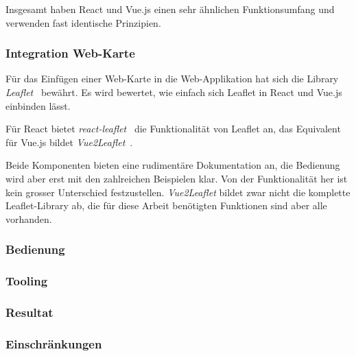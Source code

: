 Insgesamt haben React und Vue.js einen sehr ähnlichen Funktionsumfang und verwenden fast identische Prinzipien.

\subsubsection{Integration Web-Karte}
\label{Analyse Framework:Integration Web-Karte}

Für das Einfügen einer Web-Karte in die Web-Applikation hat sich die Library \emph{Leaflet}~\cite{leaflet} bewährt.
Es wird bewertet, wie einfach sich Leaflet in React und Vue.js einbinden lässt.

Für React bietet \emph{react-leaflet}~\cite{react-leaflet} die Funktionalität von Leaflet an, das Equivalent für Vue.js bildet \emph{Vue2Leaflet}~\cite{vue2leaflet}.

Beide Komponenten bieten eine rudimentäre Dokumentation an, die Bedienung wird aber erst mit den zahlreichen Beispielen klar.
Von der Funktionalität her ist kein grosser Unterschied festzustellen.
\emph{Vue2Leaflet} bildet zwar nicht die komplette Leaflet-Library ab, die für diese Arbeit benötigten Funktionen sind aber alle vorhanden.


\subsubsection{Bedienung}
\label{Analyse Framework:Bedienung}

\subsubsection{Tooling}
\label{Analyse Framework:Bedienung}


\subsubsection{Resultat}
\label{Analyse Framework:Resulat}



\subsubsection{Einschränkungen}
\label{Analyse:Einschränkungen}

